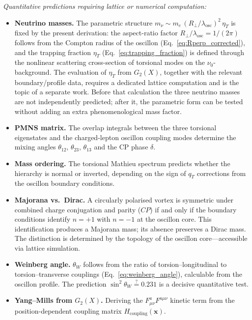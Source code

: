 \documentclass[11pt]{article}
\begin{document}
\textit{Quantitative predictions requiring
lattice or numerical computation:}
\begin{itemize}
  \item \textbf{Neutrino masses.}\;
    The parametric structure
    $m_\nu \sim m_e\,(R_\perp/\lambda_{\mathrm{osc}})^2\,
    \eta_T$ is fixed by the present derivation: the
    aspect-ratio factor
    $R_\perp/\lambda_{\mathrm{osc}} = 1/(2\pi)$
    follows from the Compton radius of the oscillon
    (Eq.~\ref{eq:Rperp_corrected}), and the trapping
    fraction $\eta_T$
    (Eq.~\ref{eq:trapping_fraction}) is defined
    through the nonlinear scattering cross-section
    of torsional modes on the $\nu_0$-background.
    The evaluation of $\eta_T$ from $G_2(X)$,
    together with the relevant boundary/profile data,
    requires a dedicated lattice computation and is
    the topic of a separate work.  Before that
    calculation the three neutrino masses are not
    independently predicted; after it, the parametric
    form can be tested without adding an extra
    phenomenological mass factor.

  \item \textbf{PMNS matrix.}\;
    The overlap integrals between the three
    torsional eigenstates and the charged-lepton
    oscillon coupling modes determine the mixing
    angles $\theta_{12}$, $\theta_{23}$,
    $\theta_{13}$ and the CP phase $\delta$.

  \item \textbf{Mass ordering.}\;
    The torsional Mathieu spectrum predicts
    whether the hierarchy is normal or inverted,
    depending on the sign of $q_T$ corrections
    from the oscillon boundary conditions.

  \item \textbf{Majorana vs.\ Dirac.}\;
    A circularly polarised vortex is symmetric
    under combined charge conjugation and
    parity ($CP$) if and only if the boundary
    conditions identify $n = +1$ with $n = -1$
    at the oscillon core.  This identification
    produces a Majorana mass; its absence
    preserves a Dirac mass.  The distinction is
    determined by the topology of the oscillon
    core---accessible via lattice
    simulation.

  \item \textbf{Weinberg angle.}\;
    $\theta_W$ follows from the ratio of
    torsion--longitudinal to
    torsion--transverse couplings
    (Eq.~\ref{eq:weinberg_angle}), calculable
    from the oscillon profile.  The prediction
    $\sin^2\theta_W \stackrel{?}{=} 0.231$ is
    a decisive quantitative test.

  \item \textbf{Yang--Mills from $G_2(X)$.}\;
    Deriving the $F_{\mu\nu}^a F^{a\mu\nu}$
    kinetic term from the position-dependent
    coupling matrix
    $H_{\mathrm{coupling}}(\mathbf{x})$.
\end{itemize}
\end{document}
